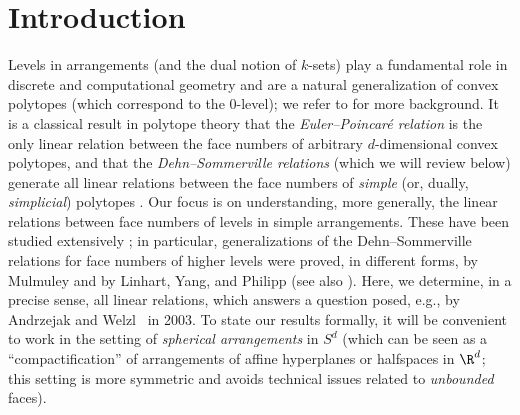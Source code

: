 \section{Introduction}
\label{s:intro}
Levels in arrangements (and the dual notion of $k$-sets) play a fundamental role in discrete and computational geometry %
and %
are a natural generalization of convex polytopes (which correspond to the $0$-level); we refer to  \cite{Edelsbrunner:1987aa,Matousek:2002aa,Wagner:2008aa} for more background.
%
It is a classical result in polytope theory that the \emph{Euler--Poincaré relation} is the only linear relation between the face numbers of arbitrary $d$-dimensional convex polytopes, and that the \emph{Dehn--Sommerville relations} 
(which we will review below) 
generate all linear relations between the face numbers of \emph{simple} (or, dually, \emph{simplicial}) polytopes \cite[Chs.~8--9]{Grunbaum:2003aa}. 
%
Our focus is on understanding, more generally, the linear relations between face numbers of levels in simple arrangements. These have been studied extensively \cite{Mulmuley:1993aa,Gulliksen:1997aa,Linhart:2000aa,Andrzejak:2003aa,Biswas:2024aa}; in particular, 
generalizations of the Dehn--Sommerville relations for face numbers of higher levels were proved, in different forms, by Mulmuley \cite{Mulmuley:1993aa} and by Linhart, Yang, and Philipp \cite{Linhart:2000aa} (see also \cite{Biswas:2024aa}). Here, we determine, in a precise sense, all linear relations, which answers a question posed, e.g., by Andrzejak and Welzl~\cite{Andrzejak:2003aa} in 2003. To state our results formally, it will be convenient to work in the setting of \emph{spherical arrangements} in $S^d$ (which can be seen as a ``compactification'' of arrangements of affine hyperplanes or halfspaces in $\R^d$; this setting is more symmetric and avoids technical issues related to \emph{unbounded} faces). 
%
